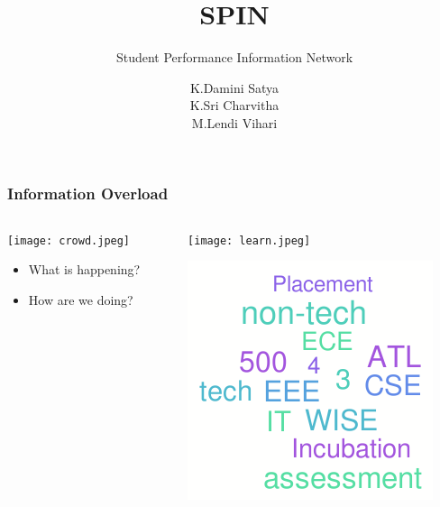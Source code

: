 \documentclass[14pt]{beamer}
\title{SPIN}
\subtitle{Student Performance Information Network}
\author[Damini Charvitha Lendi]{K.Damini Satya \\ K.Sri Charvitha \\ M.Lendi Vihari }
\institute[BVRITH]{Department of Computer Science Engineering and Information Technology}
\begin{document}
\maketitle

\begin{frame}

\frametitle{Information Overload}

	\begin{columns}[T]

		\begin{column}{.55\textwidth}
		\vspace{8mm}
		\texttt{[image: crowd.jpeg]}

				\begin{itemize}
					
					\item  What is happening? 

					\item How are we doing?

				\end{itemize}

		\end{column}

		\begin{column}{.45\textwidth}
		
		       \texttt{[image: learn.jpeg]}
		       
			\includegraphics[scale = 0.38]{tag1.png}

		\end{column}

	\end{columns} 

\end{frame}
\end{document}
